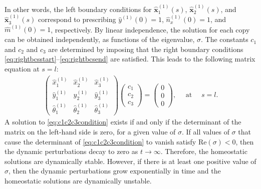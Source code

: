 In other words, the left boundary conditions for $\hat{\mathbf{x}}_1^{(1)}(s)$, $\hat{\mathbf{x}}_2^{(1)}(s)$, and $\hat{\mathbf{x}}_3^{(1)}(s)$ correspond to prescribing $\hat{y}^{(1)}(0) = 1$, $\hat{n}_x^{(1)}(0) = 1$, and $\hat{m}^{(1)}(0) = 1$, respectively. By linear independence, the solution for each copy can be obtained independently, as functions of the eigenvalue, $\sigma$. The constants $c_1$ and $c_2$ and $c_3$ are determined by imposing that the right boundary conditions \eqref{eq:rightbcsstart}--\eqref{eq:rightbcsend} are satisfied. This leads to the following matrix equation at $s = l$:
\begin{align}
\left(\begin{array}{ccc}\hat{x}_1^{(1)} & \hat{x}_2^{(1)} & \hat{x}_3^{(1)} \\
				\hat{y}_1^{(1)} & \hat{y}_2^{(1)} & \hat{y}_3^{(1)} \\ 
				\hat{\theta}_1^{(1)} & \hat{\theta}_2^{(1)} & \hat{\theta}_3^{(1)} \end{array}\right)\left(\begin{array}{c}c_1\\c_2\\c_3\end{array}\right) = \left(\begin{array}{c}0\\0\\0\end{array}\right), \quad \mbox{ at }\quad s = l.\label{eq:c1c2c3condition}
\end{align}
A solution to \eqref{eq:c1c2c3condition} exists if and only if the determinant of the matrix on the left-hand side is zero, for a given value of $\sigma$. If all values of $\sigma$ that cause the determinant of \eqref{eq:c1c2c3condition} to vanish satisfy $\mathrm{Re}(\sigma) < 0$, then the dynamic perturbations decay to zero as $t \to \infty$. Therefore, the homeostatic solutions are dynamically stable. However, if there is at least one positive value of $\sigma$, then the dynamic perturbations grow exponentially in time and the homeostatic solutions are dynamically unstable. 



